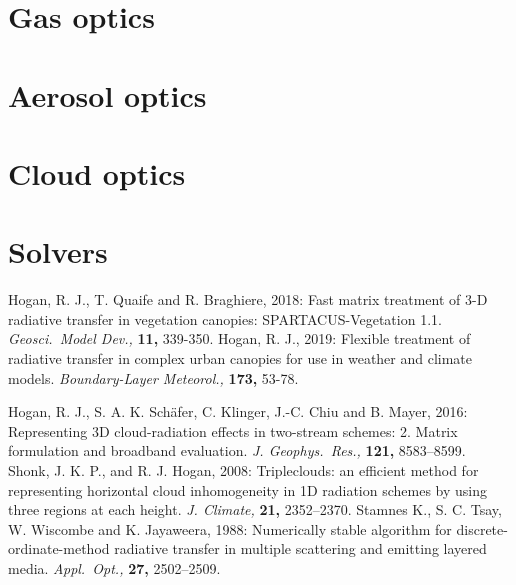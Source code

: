 \documentclass[a4,oneside]{article}
\begin{document}
\section{Gas optics}

\section{Aerosol optics}

\section{Cloud optics}

\section{Solvers}
\fi

\begin{thebibliography}{00}
%
Hogan, R. J., T. Quaife
and R. Braghiere, 2018: Fast matrix treatment of 3-D radiative
transfer in vegetation canopies: SPARTACUS-Vegetation
1.1. \textit{Geosci.\ Model Dev.,} \textbf{11,} 339-350.
%
Hogan, R. J., 2019: Flexible
treatment of radiative transfer in complex urban canopies for use in
weather and climate models. \textit{Boundary-Layer Meteorol.,}
\textbf{173,} 53-78.

%
%
Hogan, R. J.,
S. A. K. Sch\"afer, C. Klinger, J.-C. Chiu and B. Mayer, 2016:
Representing 3D cloud-radiation effects in two-stream schemes:
2. Matrix formulation and broadband
evaluation. \textit{J. Geophys.\ Res.,} \textbf{121,} 8583--8599.
%
%
Shonk, J. K. P., and
R. J. Hogan, 2008: Tripleclouds: an efficient method for representing
horizontal cloud inhomogeneity in 1D radiation schemes by using three
regions at each height. \textit{J. Climate,} \textbf{21,} 2352--2370.
%
Stamnes K.,
S. C. Tsay, W. Wiscombe and K. Jayaweera, 1988: Numerically stable
algorithm for discrete-ordinate-method radiative transfer in multiple
scattering and emitting layered media. \textit{Appl.\ Opt.,}
\textbf{27,} 2502--2509.
\end{thebibliography}
\end{document}
